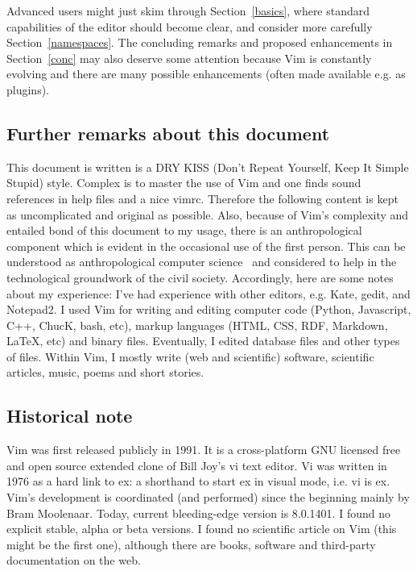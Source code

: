 \documentclass{article}
\begin{document}
Advanced users might just skim through
Section~\ref{basics}, where standard capabilities of
the editor should become clear, and consider more carefully
Section~\ref{namespaces}.
The concluding remarks and proposed enhancements in Section~\ref{conc}
may also deserve some attention because
Vim is constantly evolving
and there are many possible enhancements
(often made available e.g. as plugins).

\subsection{Further remarks about this document}
This document is written is a DRY KISS
(Don't Repeat Yourself, Keep It Simple Stupid) style.
Complex is to master the use of Vim
and one finds sound
references in help files and a nice vimrc.
Therefore the following content is kept
as uncomplicated and original as possible.
Also, because of Vim's complexity and entailed
bond of this document to my usage,
there is an anthropological component
which is evident in the occasional use of the first person.
This can be understood as anthropological computer science~\cite{anPh,anPh2}
and considered to help
in the technological groundwork of the civil society.
Accordingly, here are some notes about my experience:
I've had experience with other editors, e.g. Kate, gedit, and Notepad2.
I used Vim for writing and editing computer code 
(Python, Javascript, C++, ChucK, bash, etc), markup languages  %
(HTML, CSS, RDF, Markdown, \LaTeX, etc) and binary files.
Eventually, I edited database files and other types of files.
Within Vim, I mostly write (web and scientific) software,
scientific articles, music, poems and short stories.

\subsection{Historical note}
Vim was first released publicly in 1991.
It is a cross-platform GNU licensed free and open source
extended clone of Bill Joy's vi text editor.
Vi was written in 1976 as a hard link to ex: a shorthand
to start ex in visual mode, i.e. vi is ex.
Vim's development is coordinated (and performed) since the beginning
mainly by Bram Moolenaar.
Today, current bleeding-edge version is 8.0.1401.
I found no explicit stable, alpha or beta versions.
I found no scientific article on Vim 
(this might be the first one), although there are
books, software and third-party documentation on the
web.~\cite{wikiVim}
\end{document}
